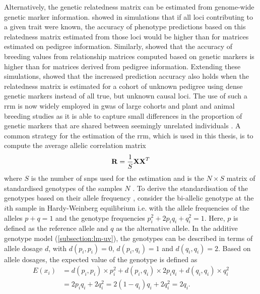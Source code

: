Alternatively, the genetic relatedness matrix can be estimated from genome-wide genetic marker information. \citet{Nejati-Javaremi1997} showed in simulations that if all loci contributing to a given trait were known, the accuracy of phenotype predictions based on this relatedness matrix estimated from those loci would be higher than for matrices estimated on pedigree information. Similarly, \citet{Villanueva2005} showed that the accuracy of breeding values from relationship matrices computed based on genetic markers is higher than for matrices derived from pedigree information. Extending these simulations, \citet{Hayes2009} showed that the increased prediction accuracy also holds when the relatedness matrix is estimated for a cohort of unknown pedigree using dense genetic markers instead of all true, but unknown causal loci. The use of such a \gls{rrm} is now widely employed in \gls{gwas} of large cohorts and plant and animal breeding studies as it is able to capture small differences in the proportion of genetic markers that are shared between seemingly unrelated individuals \citep{Lee2010,Lopes2013}. A common strategy for the estimation of the \gls{rrm}, which is used in this thesis, is to compute the average allelic correlation matrix
%
 \begin{equation}
 \boldsymbol{\mathbf{R}} = \frac{1}{S}\boldsymbol{\mathbf{XX}}^T
 \label{eq:relatedness}
 \end{equation}
where \(S\) is the number of \glspl{snp} used for the estimation and  is the \(N \times S\) matrix of standardised genotypes of the samples \(N\) \citep{Patterson2006,Yang2011}. To derive the standardisation of the genotypes based on their allele frequency \citep{Patterson2006,Yang2011,Casale2015}, consider the bi-allelic genotype at the \(i\)th sample  in Hardy-Weinberg equilibrium i.e. with the allele frequencies of the alleles  \(p + q =1\) and the genotype frequencies \(p_i^2 + 2p_iq_i + q_i^2 = 1\). Here,  \(p\) is defined as the reference allele and  \(q\) as the alternative allele. In the additive genotype model (\cref{subsection:lm-uv}), the genotypes can be described in terms of allele dosage \(d\), with \(d(p_i,p_i) = 0\), \(d(p_i,q_i) = 1\) and \(d(q_i,q_i) = 2\). Based on allele dosages, the expected value of the genotype is defined as 
\begin{align}
E(x_i) &=  d(p_i,p_i) \times p_i^2 + d(p_i,q_i) \times 2p_iq_i + d(q_i,q_i) \times  q_i^2 \\
		  &= 2p_iq_i + 2q_i^2 = 2(1-q_i)q_i + 2q_i^2 = 2q_i.
\end{align}
